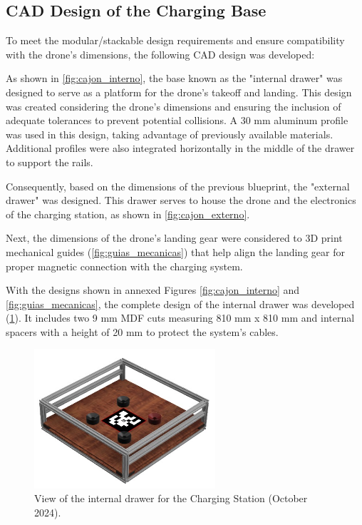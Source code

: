 \subsection{CAD Design of the Charging Base}

To meet the modular/stackable design requirements and ensure compatibility with the drone's dimensions, the following CAD design was developed:

As shown in \ref{fig:cajon_interno}, the base known as the "internal drawer" was designed to serve as a platform for the drone's takeoff and landing. This design was created considering the drone's dimensions and ensuring the inclusion of adequate tolerances to prevent potential collisions. A 30 mm aluminum profile was used in this design, taking advantage of previously available materials. Additional profiles were also integrated horizontally in the middle of the drawer to support the rails.
        
        
Consequently, based on the dimensions of the previous blueprint, the "external drawer" was designed. This drawer serves to house the drone and the electronics of the charging station, as shown in \ref{fig:cajon_externo}.
    

Next, the dimensions of the drone's landing gear were considered to 3D print mechanical guides (\ref{fig:guias_mecanicas}) that help align the landing gear for proper magnetic connection with the charging system.
    

With the designs shown in annexed Figures \ref{fig:cajon_interno} and \ref{fig:guias_mecanicas}, the complete design of the internal drawer was developed (\ref{fig:final_interno}). It includes two 9 mm MDF cuts measuring 810 mm x 810 mm and internal spacers with a height of 20 mm to protect the system's cables. 

        \begin{figure}[H]
            \centering
            \includegraphics[width=0.6\textwidth]{pictures/CAJON_INTERNO_FINAL.jpeg}
            \caption{View of the internal drawer for the Charging Station (October 2024).}
            \label{fig:final_interno}
        \end{figure}

